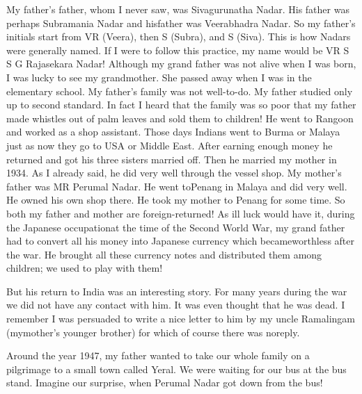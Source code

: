 My father's father, whom I never saw, was Sivagurunatha Nadar. His 
father was perhaps Subramania Nadar and his\break father was Veerabhadra 
Nadar. So my father's initials start from VR (Veera), then S (Subra), 
and S (Siva). This is how Nadars were generally named. If I were to 
follow this practice, my name would be VR S S G Rajasekara Nadar! 
Although my grand father was not alive when I was born, I was lucky to 
see my grandmother. She passed away when I was in the elementary school.
\vskip 1pt
My father's family was not well-to-do. My father studied only up to 
second standard. In fact I heard that the family was so poor that my 
father made whistles out of palm leaves and sold them to children!
\vskip 1pt
He went to Rangoon and worked as a shop assistant. Those days Indians 
went to Burma or Malaya just as now they go to USA or Middle East. After 
earning enough money he returned and got his three sisters married off. 
Then he married my mother in 1934. As I already said, he did very well 
through the vessel shop.
\vskip 1pt
My mother's father was MR Perumal Nadar. He went to\break Penang in Malaya and 
did very well. He owned his own shop there. He took my mother to Penang 
for some time. So both my father and mother are foreign-returned!
\vskip 1pt
As ill luck would have it, during the Japanese occupation\break at the time of 
the Second World War, my grand father had to convert all his money into 
Japanese currency which became\break worthless after the war. He brought all 
these currency notes and distributed them among children; we used to 
play with them!
\vskip 1pt

But his return to India was an interesting story. For many years during 
the war we did not have any contact with him. It was even thought that 
he was dead. I remember I was persuaded to write a nice letter to him by 
my uncle Ramalingam (my\break mother's younger brother) for which of course 
there was no\break reply.
\vskip 1pt

Around the year 1947, my father wanted to take our whole family on a 
pilgrimage to a small town called Yeral. We were waiting for our bus at 
the bus stand. Imagine our surprise, when Perumal Nadar got down from 
the bus!

